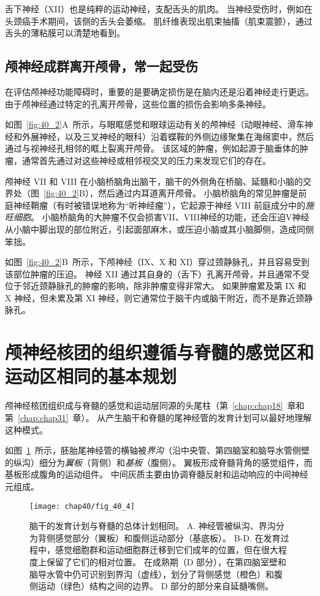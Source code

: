 舌下神经（XII）也是纯粹的运动神经，支配舌头的肌肉。
当神经受伤时，例如在头颈癌手术期间，该侧的舌头会萎缩。
肌纤维表现出肌束抽搐（肌束震颤），通过舌头的薄粘膜可以清楚地看到。



\subsection{颅神经成群离开颅骨，常一起受伤}

在评估颅神经功能障碍时，重要的是要确定损伤是在脑内还是沿着神经走行更远。
由于颅神经通过特定的孔离开颅骨，这些位置的损伤会影响多条神经。


如图~\ref{fig:40_2}A~所示，与眼眶感觉和眼球运动有关的颅神经（动眼神经、滑车神经和外展神经，以及三叉神经的眼科）沿着蝶鞍的外侧边缘聚集在海绵窦中，然后通过与视神经孔相邻的眶上裂离开颅骨。
该区域的肿瘤，例如起源于脑垂体的肿瘤，通常首先通过对这些神经或相邻视交叉的压力来发现它们的存在。


颅神经 VII 和 VIII 在小脑桥脑角出脑干，脑干的外侧角在桥脑、延髓和小脑的交界处（图~\ref{fig:40_2}B），然后通过内耳道离开颅骨。
小脑桥脑角的常见肿瘤是前庭神经鞘瘤（有时被错误地称为“听神经瘤”），它起源于神经 VIII 前庭成分中的\textit{施旺细胞}。
小脑桥脑角的大肿瘤不仅会损害VII、VIII神经的功能，还会压迫V神经从小脑中脚出现的部位附近，引起面部麻木，或压迫小脑或其小脑脚侧，造成同侧笨拙。


如图~\ref{fig:40_2}B~所示，下颅神经（IX、X 和 XI）穿过颈静脉孔，并且容易受到该部位肿瘤的压迫。
神经 XII 通过其自身的（舌下）孔离开颅骨，并且通常不受位于邻近颈静脉孔的肿瘤的影响，除非肿瘤变得非常大。
如果肿瘤累及第 IX 和 X 神经，但未累及第 XI 神经，则它通常位于脑干内或脑干附近，而不是靠近颈静脉孔。



\section{颅神经核团的组织遵循与脊髓的感觉区和运动区相同的基本规划}

颅神经核团组织成与脊髓的感觉和运动层同源的头尾柱（第~\ref{chap:chap18}~章和第~\ref{chap:chap31}~章）。
从产生脑干和脊髓的尾神经管的发育计划可以最好地理解这种模式。


如图~\ref{fig:40_4}~所示，胚胎尾神经管的横轴被\textit{界沟}（沿中央管、第四脑室和脑导水管侧壁的纵沟）细分为\textit{翼板}（背侧）和\textit{基板}（腹侧）。
翼板形成脊髓背角的感觉组件，而基板形成腹角的运动组件。
中间灰质主要由协调脊髓反射和运动响应的中间神经元组成。


\begin{figure}[htbp]
	\centering
	\texttt{[image: chap40/fig\_40\_4]}
	\caption{脑干的发育计划与脊髓的总体计划相同。
		A. 神经管被纵沟、界沟分为背侧感觉部分（翼板）和腹侧运动部分（基底板）。
		B-D. 在发育过程中，感觉细胞群和运动细胞群迁移到它们成年的位置，但在很大程度上保留了它们的相对位置。
		在成熟期（D 部分），在第四脑室壁和脑导水管中仍可识别到界沟（虚线），划分了背侧感觉（橙色）和腹侧运动（绿色）结构之间的边界。
		D 部分的部分来自延髓嘴侧。}
	\label{fig:40_4}
\end{figure}


